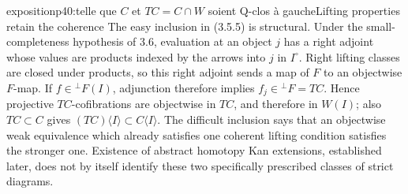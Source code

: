 \begin{dcomment}{exposition}{p40:telle que $C$ et $TC=C\cap W$ soient Q-clos à gauche}{Lifting properties retain the coherence}
The easy inclusion in (3.5.5) is structural. Under the small-completeness hypothesis of 3.6, evaluation at an object $j$ has a right adjoint whose values are products indexed by the arrows into $j$ in $I^\circ$. Right lifting classes are closed under products, so this right adjoint sends a map of $F$ to an objectwise $F$-map. If $f\in{}^\perp F(I)$, adjunction therefore implies $f_j\in{}^\perp F=TC$. Hence projective $TC$-cofibrations are objectwise in $TC$, and therefore in $W(I)$; also $TC\subset C$ gives $(TC)\langle I\rangle\subset C\langle I\rangle$. The difficult inclusion says that an objectwise weak equivalence which already satisfies one coherent lifting condition satisfies the stronger one. Existence of abstract homotopy Kan extensions, established later, does not by itself identify these two specifically prescribed classes of strict diagrams.
\end{dcomment}

